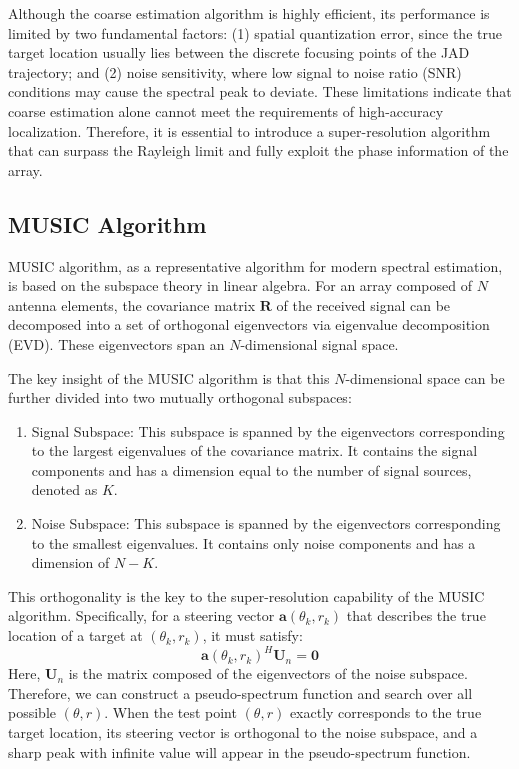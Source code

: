 \documentclass[lettersize,journal]{IEEEtran}
\begin{document}
Although the coarse estimation algorithm is highly efficient, its performance is limited by two fundamental factors: (1) spatial quantization error, since the true target location usually lies between the discrete focusing points of the JAD trajectory; and (2) noise sensitivity, where low signal to noise ratio (SNR) conditions may cause the spectral peak to deviate. These limitations indicate that coarse estimation alone cannot meet the requirements of high-accuracy localization. Therefore, it is essential to introduce a super-resolution algorithm that can surpass the Rayleigh limit and fully exploit the phase information of the array.

\subsection{MUSIC Algorithm}

MUSIC algorithm, as a representative algorithm for modern spectral estimation, is based on the subspace theory in linear algebra. For an array composed of $N$ antenna elements, the covariance matrix $\mathbf{R}$ of the received signal can be decomposed into a set of orthogonal eigenvectors via eigenvalue decomposition (EVD). These eigenvectors span an $N$-dimensional signal space.

The key insight of the MUSIC algorithm is that this $N$-dimensional space can be further divided into two mutually orthogonal subspaces:

\begin{enumerate}
	\item Signal Subspace: This subspace is spanned by the eigenvectors corresponding to the largest eigenvalues of the covariance matrix. It contains the signal components and has a dimension equal to the number of signal sources, denoted as $K$.
	\item Noise Subspace: This subspace is spanned by the eigenvectors corresponding to the smallest eigenvalues. It contains only noise components and has a dimension of $N-K$.
\end{enumerate}

This orthogonality is the key to the super-resolution capability of the MUSIC algorithm. Specifically, for a steering vector $\mathbf{a}(\theta_k, r_k)$ that describes the true location of a target at $(\theta_k, r_k)$, it must satisfy:
\begin{equation}
	\mathbf{a}(\theta_k, r_k)^H \mathbf{U}_n = \mathbf{0}
\end{equation}
Here, $\mathbf{U}_n$ is the matrix composed of the eigenvectors of the noise subspace. Therefore, we can construct a pseudo-spectrum function and search over all possible $(\theta, r)$. When the test point $(\theta, r)$ exactly corresponds to the true target location, its steering vector is orthogonal to the noise subspace, and a sharp peak with infinite value will appear in the pseudo-spectrum function.
\end{document}
